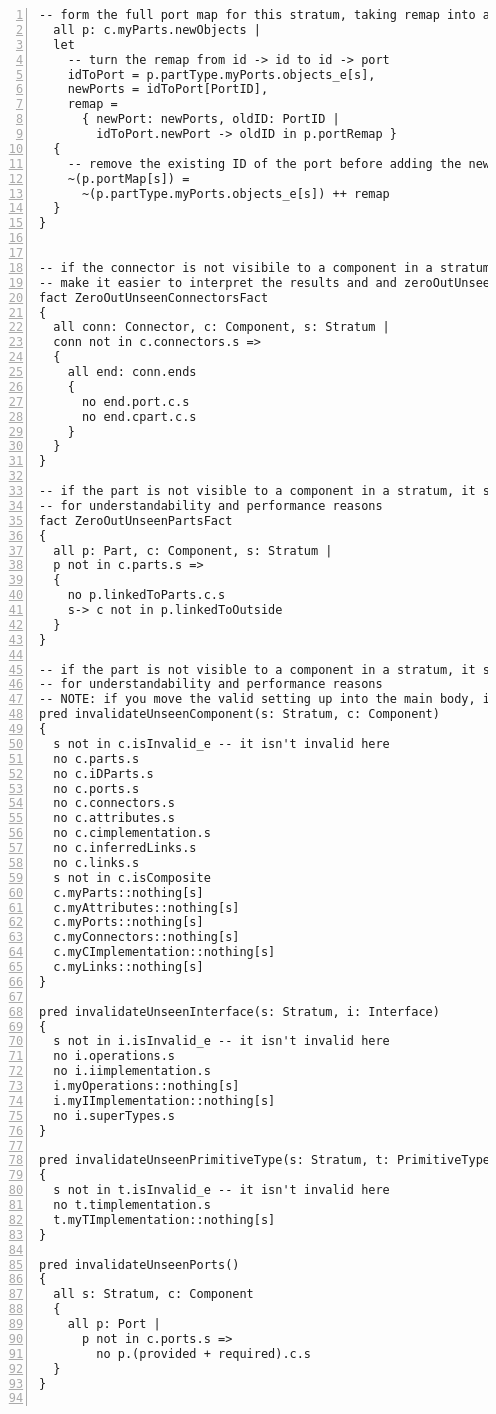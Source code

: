 \begin{lstlisting}[caption={bb.als}, numbers=left]
  -- form the full port map for this stratum, taking remap into account
  all p: c.myParts.newObjects |
  let
    -- turn the remap from id -> id to id -> port
    idToPort = p.partType.myPorts.objects_e[s],
    newPorts = idToPort[PortID],
    remap =
      { newPort: newPorts, oldID: PortID |
        idToPort.newPort -> oldID in p.portRemap }
  {
    -- remove the existing ID of the port before adding the new one
    ~(p.portMap[s]) =
      ~(p.partType.myPorts.objects_e[s]) ++ remap
  }
}


-- if the connector is not visibile to a component in a stratum, it should be zeroed out to
-- make it easier to interpret the results and and zeroOutUnseenElement[s, e] cut back on the state space for performance reasons
fact ZeroOutUnseenConnectorsFact
{
  all conn: Connector, c: Component, s: Stratum |
  conn not in c.connectors.s =>
  {
    all end: conn.ends
    {
      no end.port.c.s
      no end.cpart.c.s
    }
  }
}

-- if the part is not visible to a component in a stratum, it should also be zeroed out
-- for understandability and performance reasons
fact ZeroOutUnseenPartsFact
{
  all p: Part, c: Component, s: Stratum |
  p not in c.parts.s =>
  {
    no p.linkedToParts.c.s
    s-> c not in p.linkedToOutside
  }
}

-- if the part is not visible to a component in a stratum, it should also be zeroed out
-- for understandability and performance reasons
-- NOTE: if you move the valid setting up into the main body, it gets slow
pred invalidateUnseenComponent(s: Stratum, c: Component)
{
  s not in c.isInvalid_e -- it isn't invalid here
  no c.parts.s
  no c.iDParts.s
  no c.ports.s
  no c.connectors.s
  no c.attributes.s
  no c.cimplementation.s
  no c.inferredLinks.s
  no c.links.s
  s not in c.isComposite
  c.myParts::nothing[s]
  c.myAttributes::nothing[s]
  c.myPorts::nothing[s]
  c.myConnectors::nothing[s]
  c.myCImplementation::nothing[s]
  c.myLinks::nothing[s]
}

pred invalidateUnseenInterface(s: Stratum, i: Interface)
{
  s not in i.isInvalid_e -- it isn't invalid here
  no i.operations.s
  no i.iimplementation.s
  i.myOperations::nothing[s]
  i.myIImplementation::nothing[s]
  no i.superTypes.s
}

pred invalidateUnseenPrimitiveType(s: Stratum, t: PrimitiveType)
{
  s not in t.isInvalid_e -- it isn't invalid here
  no t.timplementation.s
  t.myTImplementation::nothing[s]
}

pred invalidateUnseenPorts()
{
  all s: Stratum, c: Component
  {
    all p: Port |
      p not in c.ports.s =>
        no p.(provided + required).c.s
  }
}


\end{lstlisting}
